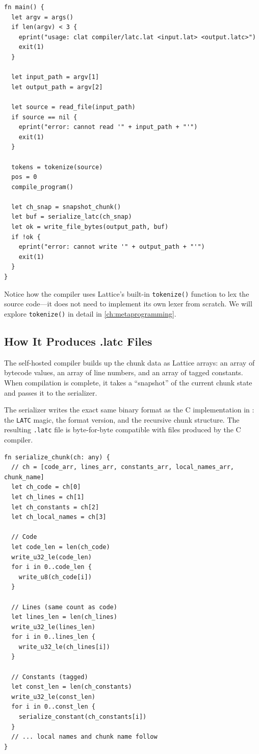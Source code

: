 \begin{lstlisting}[language=Lattice, caption={The compiler's main function}]
fn main() {
  let argv = args()
  if len(argv) < 3 {
    eprint("usage: clat compiler/latc.lat <input.lat> <output.latc>")
    exit(1)
  }

  let input_path = argv[1]
  let output_path = argv[2]

  let source = read_file(input_path)
  if source == nil {
    eprint("error: cannot read '" + input_path + "'")
    exit(1)
  }

  tokens = tokenize(source)
  pos = 0
  compile_program()

  let ch_snap = snapshot_chunk()
  let buf = serialize_latc(ch_snap)
  let ok = write_file_bytes(output_path, buf)
  if !ok {
    eprint("error: cannot write '" + output_path + "'")
    exit(1)
  }
}
\end{lstlisting}

Notice how the compiler uses Lattice's built-in \lstinline|tokenize()| function to lex the source code---it does not need to implement its own lexer from scratch. We will explore \lstinline|tokenize()| in detail in \cref{ch:metaprogramming}.

\subsection{How It Produces .latc Files}

The self-hosted compiler builds up the chunk data as Lattice arrays: an array of bytecode values, an array of line numbers, and an array of tagged constants. When compilation is complete, it takes a ``snapshot'' of the current chunk state and passes it to the serializer.

The serializer writes the exact same binary format as the C implementation in : the \texttt{LATC} magic, the format version, and the recursive chunk structure. The resulting \lstinline|.latc| file is byte-for-byte compatible with files produced by the C compiler.

\begin{lstlisting}[language=Lattice, caption={Serialization in the self-hosted compiler}]
fn serialize_chunk(ch: any) {
  // ch = [code_arr, lines_arr, constants_arr, local_names_arr, chunk_name]
  let ch_code = ch[0]
  let ch_lines = ch[1]
  let ch_constants = ch[2]
  let ch_local_names = ch[3]

  // Code
  let code_len = len(ch_code)
  write_u32_le(code_len)
  for i in 0..code_len {
    write_u8(ch_code[i])
  }

  // Lines (same count as code)
  let lines_len = len(ch_lines)
  write_u32_le(lines_len)
  for i in 0..lines_len {
    write_u32_le(ch_lines[i])
  }

  // Constants (tagged)
  let const_len = len(ch_constants)
  write_u32_le(const_len)
  for i in 0..const_len {
    serialize_constant(ch_constants[i])
  }
  // ... local names and chunk name follow
}
\end{lstlisting}


